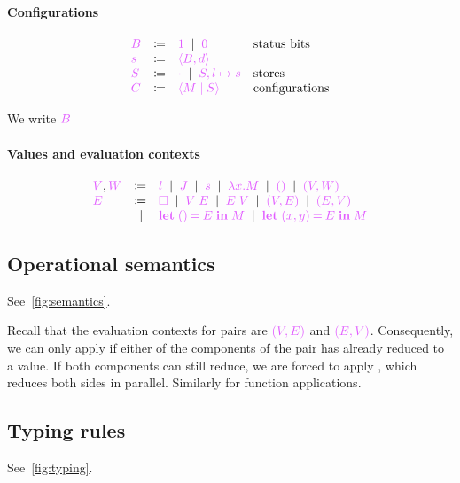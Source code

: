 \documentclass[main.tex]{subfiles}
\begin{document}
\paragraph*{Configurations}
\[
\begin{array}{lrll}
  \tm{B}
  & \coloneqq & \tm{1}
    \sep        \tm{0} & \text{status bits}
  \\
  \tm{s}
  & \coloneqq & \tm{\langle B, d \rangle}
  \\
  \tm{S}
  & \coloneqq & \tm{\emptyenv}
    \sep        \tm{S, l \mapsto s} & \text{stores}
  \\
  \tm{C}
  & \coloneqq & \tm{\config{M}{S}} & \text{configurations}
\end{array}
\]

We write $\tm{B}$

\paragraph*{Values and evaluation contexts}
\[
\begin{array}{lrll}
  \tm{V}, \tm{W}
  & \coloneqq & \tm{l}
    \sep        \tm{J}
    \sep        \tm{s}
    \sep        \tm{\lambda x.M}
    \sep        \tm{\unit}
    \sep        \tm{\pair{V}{W}}
  \\
  \tm{E}
  & \coloneqq & \tm{\hole}
    \sep        \tm{V\; E}
    \sep        \tm{E\; V}
    \sep        \tm{(V, E)}
    \sep        \tm{(E, V)} \\
  & \sep      & \tm{\letunit{E}{M}}
    \sep        \tm{\letpair{x}{y}{E}{M}}
\end{array}
\]

\subsection{Operational semantics}
\label{sec:lvar-semantics}

See~\cref{fig:semantics}.

Recall that the evaluation contexts for pairs are $\tm{(V, E)}$ and $\tm{(E, V)}$. Consequently, we can only apply  if either of the components of the pair has already reduced to a value. If both components can still reduce, we are forced to apply , which reduces both sides in parallel. Similarly for function applications.

\subsection{Typing rules}%
\label{sec:lvar-typing}

See~\cref{fig:typing}.
\end{document}
